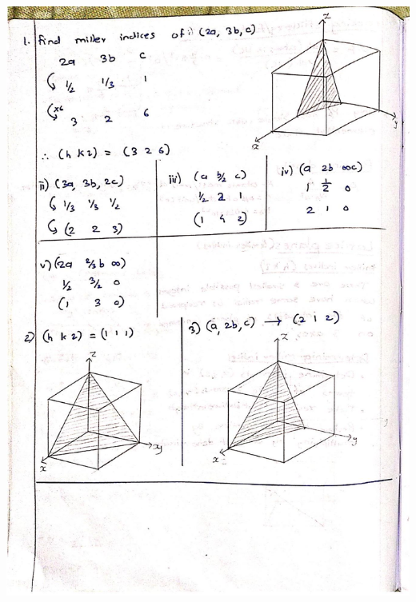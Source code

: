 \documentclass[10pt]{article}
\begin{document}
\begin{center}
\includegraphics[max width=\textwidth]{2024_06_16_30d750483617f1939202g-08(1)}
\end{center}
\end{document}
